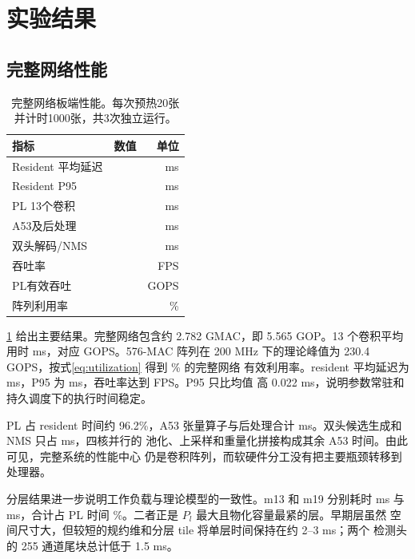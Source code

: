 \section{实验结果}
\label{sec:results}

\subsection{完整网络性能}

\begin{table}[t]
\centering
\caption{完整网络板端性能。每次预热20张并计时1000张，共3次独立运行。}
\label{tab:academic-performance}
\small
\setlength{\tabcolsep}{4.5pt}
\begin{tabular}{lrr}
\toprule
指标 & 数值 & 单位 \\
\midrule
Resident 平均延迟 & \ResidentMeanMs{} & ms \\
Resident P95 & \ResidentPNinetyFiveMs{} & ms \\
PL 13个卷积 & \PLMeanMs{} & ms \\
A53及后处理 & \AFTMeanMs{} & ms \\
双头解码/NMS & \DecodeMeanMs{} & ms \\
吞吐率 & \ResidentFPS{} & FPS \\
PL有效吞吐 & \PLEffectiveGOPS{} & GOPS \\
阵列利用率 & \ArrayUtilization{} & \% \\
\bottomrule
\end{tabular}
\end{table}

\cref{tab:academic-performance} 给出主要结果。完整网络包含约 2.782 GMAC，即
5.565 GOP。13 个卷积平均用时 \PLMeanMs{} ms，对应
\PLEffectiveGOPS{} GOPS。576-MAC 阵列在 200 MHz 下的理论峰值为
230.4 GOPS，按式\eqref{eq:utilization} 得到 \ArrayUtilization{}\% 的完整网络
有效利用率。resident 平均延迟为 \ResidentMeanMs{} ms，P95 为
\ResidentPNinetyFiveMs{} ms，吞吐率达到 \ResidentFPS{} FPS。P95 只比均值
高 0.022 ms，说明参数常驻和持久调度下的执行时间稳定。

PL 占 resident 时间约 96.2\%，A53 张量算子与后处理合计
\AFTMeanMs{} ms。双头候选生成和 NMS 只占 \DecodeMeanMs{} ms，四核并行的
池化、上采样和重量化拼接构成其余 A53 时间。由此可见，完整系统的性能中心
仍是卷积阵列，而软硬件分工没有把主要瓶颈转移到处理器。



分层结果进一步说明工作负载与理论模型的一致性。m13 和 m19 分别耗时
\MThirteenMeanMs{} ms 与 \MNineteenMeanMs{} ms，合计占 PL 时间
\LongLayerPLShare{}\%。二者正是 $P_l$ 最大且物化容量最紧的层。早期层虽然
空间尺寸大，但较短的规约维和分层 tile 将单层时间保持在约 2--3 ms；两个
检测头的 255 通道尾块总计低于 1.5 ms。

